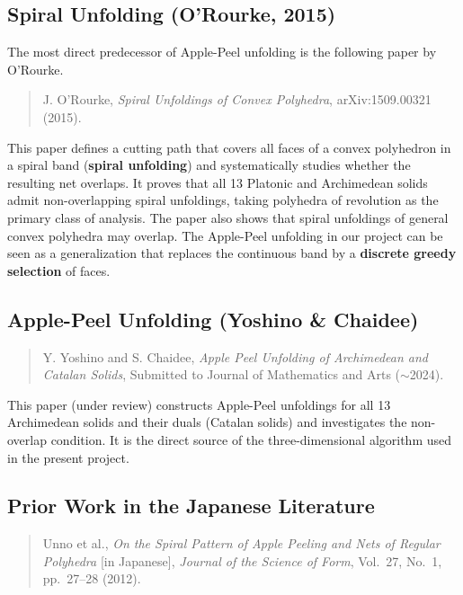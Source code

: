 \documentclass[a4paper,11pt]{article}
\begin{document}
\subsection{Spiral Unfolding (O'Rourke, 2015)}

The most direct predecessor of Apple-Peel unfolding is the following paper by O'Rourke.

\begin{quotation}\noindent
  J. O'Rourke,
  \textit{Spiral Unfoldings of Convex Polyhedra},
  arXiv:1509.00321 (2015).
\end{quotation}

This paper defines a cutting path that covers all faces of a convex polyhedron in a spiral band
(\textbf{spiral unfolding}) and systematically studies whether the resulting net overlaps.
It proves that all 13 Platonic and Archimedean solids admit non-overlapping spiral unfoldings,
taking polyhedra of revolution as the primary class of analysis.
The paper also shows that spiral unfoldings of general convex polyhedra may overlap.
The Apple-Peel unfolding in our project can be seen as a generalization that replaces the
continuous band by a \textbf{discrete greedy selection} of faces.

\subsection{Apple-Peel Unfolding (Yoshino \& Chaidee)}

\begin{quotation}\noindent
  Y. Yoshino and S. Chaidee,
  \textit{Apple Peel Unfolding of Archimedean and Catalan Solids},
  Submitted to Journal of Mathematics and Arts ($\sim$2024).
\end{quotation}

This paper (under review) constructs Apple-Peel unfoldings for all 13 Archimedean solids
and their duals (Catalan solids) and investigates the non-overlap condition.
It is the direct source of the three-dimensional algorithm used in the present project.

\subsection{Prior Work in the Japanese Literature}

\begin{quotation}\noindent
  Unno et al.,
  \textit{On the Spiral Pattern of Apple Peeling and Nets of Regular Polyhedra} [in Japanese],
  \textit{Journal of the Science of Form}, Vol.~27, No.~1, pp.~27--28 (2012).
\end{quotation}
\end{document}
